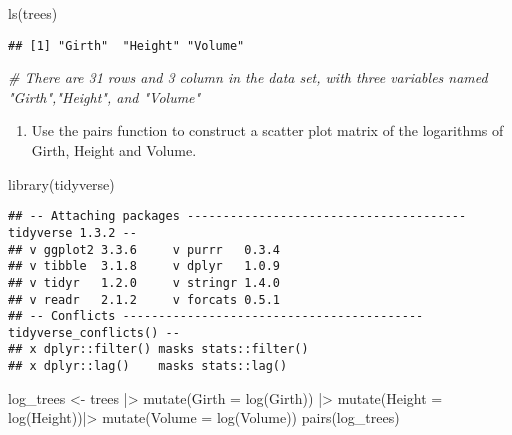 \documentclass[
]{article}
\newenvironment{Shaded}{\begin{snugshade}}{\end{snugshade}}
\newcommand{\AttributeTok}[1]{\textcolor[rgb]{0.77,0.63,0.00}{#1}}
\newcommand{\CommentTok}[1]{\textcolor[rgb]{0.56,0.35,0.01}{\textit{#1}}}
\newcommand{\FunctionTok}[1]{\textcolor[rgb]{0.00,0.00,0.00}{#1}}
\newcommand{\NormalTok}[1]{#1}
\newcommand{\OtherTok}[1]{\textcolor[rgb]{0.56,0.35,0.01}{#1}}
\newcommand{\SpecialCharTok}[1]{\textcolor[rgb]{0.00,0.00,0.00}{#1}}
\providecommand{\tightlist}{%
  \setlength{\itemsep}{0pt}\setlength{\parskip}{0pt}}
\begin{document}
\begin{Shaded}
\begin{Highlighting}[]
\FunctionTok{ls}\NormalTok{(trees) }
\end{Highlighting}
\end{Shaded}

\begin{verbatim}
## [1] "Girth"  "Height" "Volume"
\end{verbatim}

\begin{Shaded}
\begin{Highlighting}[]
\CommentTok{\# There are 31 rows and 3 column in the data set, with three variables named "Girth","Height", and  "Volume"}
\end{Highlighting}
\end{Shaded}

\begin{enumerate}
\def\labelenumi{(\alph{enumi})}
\setcounter{enumi}{1}
\tightlist
\item
  Use the pairs function to construct a scatter plot matrix of the
  logarithms of Girth, Height and Volume.
\end{enumerate}

\begin{Shaded}
\begin{Highlighting}[]
\FunctionTok{library}\NormalTok{(tidyverse)}
\end{Highlighting}
\end{Shaded}

\begin{verbatim}
## -- Attaching packages --------------------------------------- tidyverse 1.3.2 --
## v ggplot2 3.3.6     v purrr   0.3.4
## v tibble  3.1.8     v dplyr   1.0.9
## v tidyr   1.2.0     v stringr 1.4.0
## v readr   2.1.2     v forcats 0.5.1
## -- Conflicts ------------------------------------------ tidyverse_conflicts() --
## x dplyr::filter() masks stats::filter()
## x dplyr::lag()    masks stats::lag()
\end{verbatim}

\begin{Shaded}
\begin{Highlighting}[]
\NormalTok{log\_trees }\OtherTok{\textless{}{-}}\NormalTok{ trees }\SpecialCharTok{|\textgreater{}}
  \FunctionTok{mutate}\NormalTok{(}\AttributeTok{Girth =} \FunctionTok{log}\NormalTok{(Girth)) }\SpecialCharTok{|\textgreater{}}
  \FunctionTok{mutate}\NormalTok{(}\AttributeTok{Height =} \FunctionTok{log}\NormalTok{(Height))}\SpecialCharTok{|\textgreater{}}
  \FunctionTok{mutate}\NormalTok{(}\AttributeTok{Volume =} \FunctionTok{log}\NormalTok{(Volume))}
\FunctionTok{pairs}\NormalTok{(log\_trees)}
\end{Highlighting}
\end{Shaded}
\end{document}
